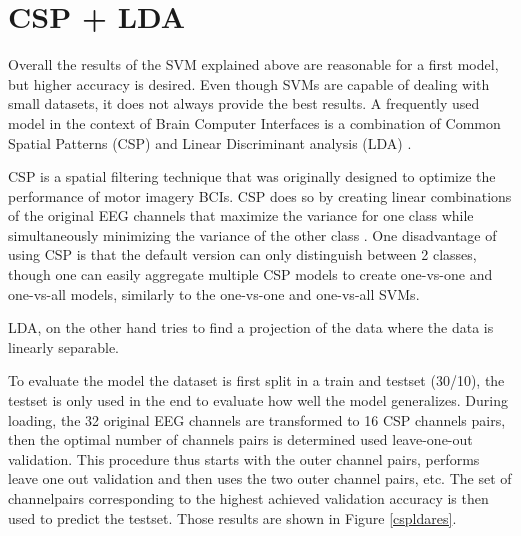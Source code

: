 \clearpage

\section{CSP + LDA}

Overall the results of the SVM explained above are reasonable for a first model, but higher accuracy is desired. Even though SVMs are capable of dealing with small datasets, it does not always provide the best results\cite{svmldacomp}. A frequently used model in the context of Brain Computer Interfaces is a combination of Common Spatial Patterns (CSP) and Linear Discriminant analysis (LDA)  \cite{ErrorPotentials,svmldacomp,currTrends}. 

\npar

CSP is a spatial filtering technique that was originally designed to optimize the performance of motor imagery BCIs. CSP does so by creating linear combinations of the original EEG channels that maximize the variance for one class while simultaneously minimizing the variance of the other class \cite{ErrorPotentials}. One disadvantage of using CSP is that the default version can only distinguish between 2 classes, though one can easily aggregate multiple CSP models to create one-vs-one and one-vs-all models, similarly to the one-vs-one and one-vs-all SVMs.

\npar 

LDA, on the other hand tries to find a projection of the data where the data is linearly separable.

To evaluate the model the dataset is first split in a train and testset (30/10), the testset is only used in the end to evaluate how well the model generalizes. During loading, the 32 original EEG channels are transformed to 16 CSP channels pairs, then the optimal number of channels pairs is determined used leave-one-out validation. This procedure thus starts with the outer channel pairs, performs leave one out validation and then uses the two outer channel pairs, etc. The set of channelpairs corresponding to the highest achieved validation accuracy is then used to predict the testset. Those results are shown in Figure \ref{cspldares}.


